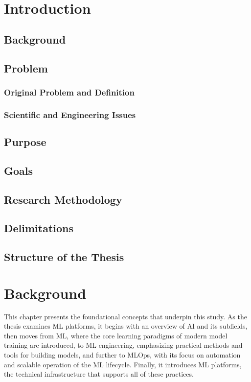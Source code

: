 \documentclass[
english,                 %
bibtex,                  %
includeExtraAbstracts, %
]{kththesis}
\numberwithin{listing}{chapter}
\begin{document}
\chapter{Introduction}

\section{Background}

\section{Problem}

\subsection{Original Problem and Definition}
\subsection{Scientific and Engineering Issues}

\section{Purpose}
\section{Goals}
\section{Research Methodology}
\section{Delimitations}
\section{Structure of the Thesis}

\cleardoublepage

\chapter{Background}

This chapter presents the foundational concepts that underpin this study. As the thesis examines \gls{ML} platforms, it begins with an overview of \gls{AI} and its subfields, then moves from \gls{ML}, where the core learning paradigms of modern model training are introduced, to \gls{ML} engineering, emphasizing practical methods and tools for building models, and further to \gls{MLOps}, with its focus on automation and scalable operation of the \gls{ML} lifecycle. Finally, it introduces \gls{ML} platforms, the technical infrastructure that supports all of these practices.
\end{document}
